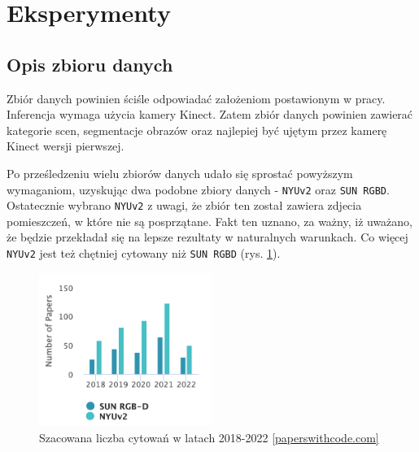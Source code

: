 \newpage %
\section{Eksperymenty}
\subsection{Opis zbioru danych}

Zbiór danych powinien ściśle odpowiadać założeniom postawionym w pracy. Inferencja wymaga użycia kamery Kinect. Zatem zbiór danych powinien zawierać kategorie scen, segmentacje obrazów oraz najlepiej być ujętym przez kamerę Kinect wersji pierwszej.

Po prześledzeniu wielu zbiorów danych udało się sprostać powyższym wymaganiom, uzyskując dwa podobne zbiory danych - \texttt{NYUv2} oraz \texttt{SUN RGBD}. Ostatecznie wybrano \texttt{NYUv2} z uwagi, że zbiór ten został zawiera zdjecia
pomieszczeń, w które nie są posprzątane. Fakt ten uznano, za ważny, iż uważano, że będzie przekładał się na lepsze rezultaty w naturalnych warunkach. Co więcej \texttt{NYUv2} jest też chętniej cytowany niż \texttt{SUN RGBD} (rys. \ref{fig:sun-vs-nyu}).

\begin{figure}[ht!]
    \centering
    \includegraphics[width=0.5\textwidth]{img/stats-dataset.png}
    \caption[]{Szacowana liczba cytowań w latach 2018-2022 \href{https://paperswithcode.com/dataset/sun-rgb-d}{[paperswithcode.com]}}
    \label{fig:sun-vs-nyu}
\end{figure}

